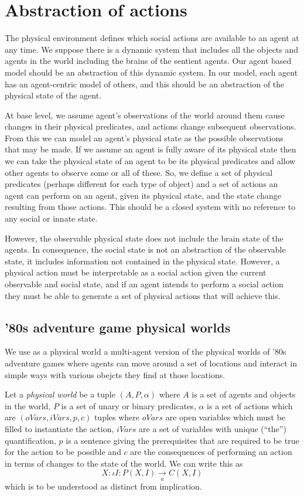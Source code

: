 \documentclass[a4paper]{article}
\begin{document}
\section{Abstraction of actions}

The physical environment defines which social actions are available to an agent at any time. We suppose there is a dynamic system that includes all the objects and agents in the world including the brains of the sentient agents. Our agent based model should be an abstraction of this dynamic system. In our model, each agent has an agent-centric model of others, and this should be an abstraction of the physical state of the agent.

At base level, we assume agent's observations of the world around them cause changes in their physical predicates, and actions change subsequent observations. From this we can model an agent's physical state as the possible observations that may be made. If we assume an agent is fully aware of its physical state then we can take the physical state of an agent to be its physical predicates and allow other agents to observe some or all of these. So, we define a set of physical predicates (perhaps different for each type of object) and a set of actions an agent can perform on an agent, given its physical state, and the state change resulting from those actions. This should be a closed system with no reference to any social or innate state.

However, the observable physical state does not include the brain state of the agents. In consequence, the social state is not an abstraction of the observable state, it includes information not contained in the physical state. However, a physical action must be interpretable as a social action given the current observable and social state, and if an agent intends to perform a social action they must be able to generate a set of physical actions that will achieve this.

\subsection{'80s adventure game physical worlds}

We use as a physical world a multi-agent version of the physical worlds of '80s adventure games where agents can move around a set of locations and interact in simple ways with various obejcts they find at those locations.

Let a \textit{physical world} be a tuple $(A,P,\alpha)$ where $A$ is a set of agents and objects in the world, $P$ is a set of unary or binary predicates, $\alpha$ is a set of actions which are $(oVars,iVars,p,c)$ tuples where $oVars$ are open variables which must be filled to instantiate the action, $iVars$ are a set of variables with unique (``the'') quantification, $p$ is a sentence giving the prerequisites that are required to be true for the action to be possible and $c$ are the consequences of performing an action in terms of changes to the state of the world. We can write this as
\[
X: \iota I: P(X,I) \underset{a}{\to} C(X,I)
\]
which is to be understood as distinct from implication.
\end{document}
